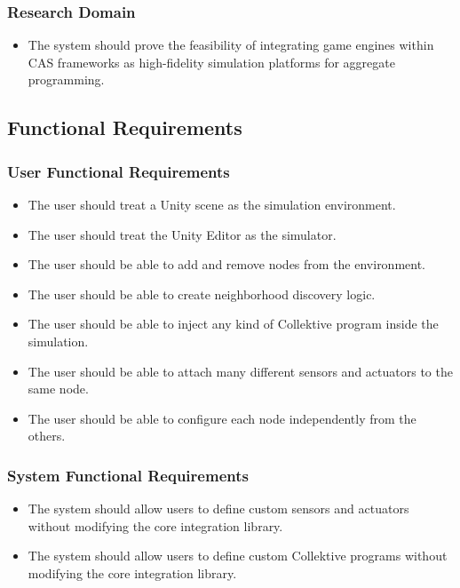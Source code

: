 \subsubsection{Research Domain}
\begin{itemize}
    \item The system should prove the feasibility of integrating game engines within \ac{CAS} frameworks as high-fidelity simulation platforms for aggregate programming.
\end{itemize}

\subsection{Functional Requirements}

\subsubsection{User Functional Requirements}

\begin{itemize}
	\item The user should treat a Unity scene as the simulation environment.
	\item The user should treat the Unity Editor as the simulator.
	\item The user should be able to add and remove nodes from the environment.
	\item The user should be able to create neighborhood discovery logic.
	\item The user should be able to inject any kind of Collektive program inside the simulation.
	\item The user should be able to attach many different sensors and actuators to the same node.
	\item The user should be able to configure each node independently from the others.
\end{itemize}

\subsubsection{System Functional Requirements}

\begin{itemize}
	\item The system should allow users to define custom sensors and actuators without modifying the core integration library.
	\item The system should allow users to define custom Collektive programs without modifying the core integration library.
\end{itemize}

